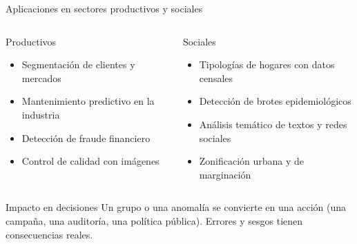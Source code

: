 \documentclass[aspectratio=169,11pt]{beamer}
\begin{document}
\begin{frame}{Aplicaciones en sectores productivos y sociales}
  \begin{columns}[T]
    \begin{block}{Productivos}
      \begin{itemize}
        \item Segmentación de clientes y mercados
        \item Mantenimiento predictivo en la industria
        \item Detección de fraude financiero
        \item Control de calidad con imágenes
      \end{itemize}
    \end{block}
    \begin{block}{Sociales}
      \begin{itemize}
        \item Tipologías de hogares con datos censales
        \item Detección de brotes epidemiológicos
        \item Análisis temático de textos y redes sociales
        \item Zonificación urbana y de marginación
      \end{itemize}
    \end{block}
  \end{columns}
  \vspace{6pt}
  \begin{alertblock}{Impacto en decisiones}
    Un grupo o una anomalía se convierte en una acción (una campaña, una auditoría, una
    política pública). Errores y sesgos tienen consecuencias reales.
  \end{alertblock}
\end{frame}
\end{document}
